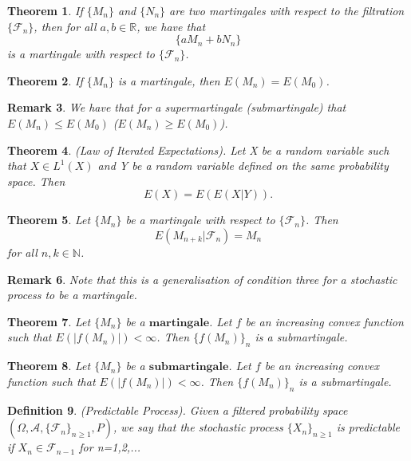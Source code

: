 \documentclass[twoside]{article}
\newcounter{lecnum}
\newtheorem{theorem}{Theorem}[lecnum]
\newtheorem{remark}[theorem]{Remark}
\newtheorem{definition}[theorem]{Definition}
\begin{document}
\begin{theorem} If $\{M_n\}$ and $\{N_n\}$ are two martingales with respect to the filtration $\{\mathcal{F}_n\}$, then for all $a, b \in \mathbb{R}$, we have that 
$$
\{aM_n + bN_n\}
$$
is a martingale with respect to $\{\mathcal{F}_n\}$.
\end{theorem}

\begin{theorem} If $\{M_n\}$ is a martingale, then $E(M_n) = E(M_0)$.
\end{theorem}

\begin{remark} We have that for a supermartingale (submartingale) that $E(M_n) \leq E(M_0)$ ($E(M_n) \geq E(M_0)$).
\end{remark}

\begin{theorem}(Law of Iterated Expectations). Let X be a random variable such that $X \in L^1(X)$ and Y be a random variable defined on the same probability space. Then
$$
E(X) = E(E(X|Y)).
$$
\end{theorem}

\begin{theorem}Let $\{M_n\}$ be a martingale with respect to $\{\mathcal{F}_n\}$. Then $$
E(M_{n+k}|\mathcal{F}_n) = M_n
$$
for all $n, k \in \mathbb{N}$.
\end{theorem}

\begin{remark}Note that this is a generalisation of condition three for a stochastic process to be a martingale.
\end{remark}

\begin{theorem} Let $\{M_n\}$ be a $\textbf{martingale}$. Let $f$ be an increasing convex function such that $E(|f(M_n)|) < \infty$. Then $\{f(M_n)\}_n$ is a submartingale.
\end{theorem}

\begin{theorem} Let $\{M_n\}$ be a $\textbf{submartingale}$. Let $f$ be an increasing convex function such that $E(|f(M_n)|) < \infty$. Then $\{f(M_n)\}_n$ is a submartingale.
\end{theorem}

\begin{definition}(Predictable Process). Given a filtered probability space $(\Omega, \mathcal{A}, \{\mathcal{F}_n\}_{n \geq 1}, P)$, we say that the stochastic process $\{X_n\}_{n \geq 1}$ is predictable if $X_n \in \mathcal{F}_{n -1}$ for n=1,2,...
\end{definition}
\end{document}
